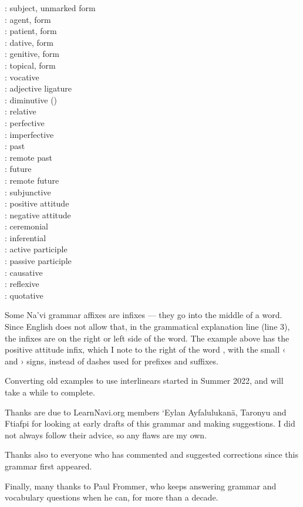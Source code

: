 \begin{multicols}{3}
\noindent{}: subject, unmarked form \\
: agent,  form \\
: patient,  form \\
: dative,  form \\
: genitive,  form \\
: topical,  form \\
: vocative  \\
: adjective  ligature\\
: diminutive () \\
: relative  \\
: perfective \\
: imperfective \\
: past \\
: remote past \\
: future \\
: remote future \\
: subjunctive \\
: positive attitude \\
: negative attitude \\
: ceremonial \\
: inferential \\
: active participle \\
: passive participle \\
: causative \\
: reflexive \\
: quotative 
\end{multicols}

\noindent Some Na'vi grammar affixes are infixes — they go into the
middle of a word.  Since English does not allow that, in the
grammatical explanation line (line 3), the infixes are on the right or
left side of the word.  The example above has the positive attitude
infix, which I note to the right of the word , with the small ‹
and › signs, instead of dashes used for prefixes and suffixes.

Converting old examples to use interlinears started in Summer 2022,
and will take a while to complete.


\vfill
Thanks are due to LearnNavi.org members `Eylan Ayfalulukanä, Taronyu
and Ftiafpi for looking at early drafts of this grammar and making
suggestions.  I did not always follow their advice, so any flaws are
my own.

Thanks also to everyone who has commented and suggested corrections
since this grammar first appeared.

Finally, many thanks to Paul Frommer, who keeps answering grammar
and vocabulary ques\-tions when he can, for more than a decade.

\bigskip
